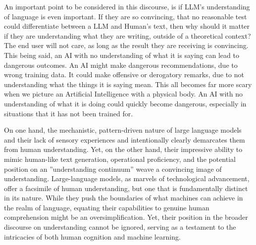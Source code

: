 \documentclass{article}
\begin{document}
An important point to be considered in this discourse, is if LLM's understanding of language is even important. If they are so convincing, that no reasonable test could differentiate between a LLM and Human's text, then why should it matter if they are understanding what they are writing, outside of a theoretical context? The end user will not care, as long as the result they are receiving is convincing. This being said, an AI with no understanding of what it is saying can lead to dangerous outcomes. An AI might make dangerous recommendations, due to wrong training data. It could make offensive or derogatory remarks, due to not understanding what the things it is saying mean. This all becomes far more scary when we picture an Artificial Intelligence with a physical body. An AI with no understanding of what it is doing could quickly become dangerous, especially in situations that it has not been trained for.

On one hand, the mechanistic, pattern-driven nature of large language models and their lack of sensory experiences and intentionally clearly
demarcates them from human understanding. Yet, on the other hand, their
impressive ability to mimic human-like text generation, operational proficiency,
and the potential position on an ”understanding continuum” weave a convincing image of understanding. Large-language models, as marvels of technological advancement, offer a facsimile of human understanding, but one that is fundamentally distinct in its nature. While they push the boundaries of what machines can achieve in the realm of language, equating
their capabilities to genuine human comprehension might be an oversimplification. Yet, their position in the broader discourse on understanding cannot be ignored, serving as a testament to the intricacies of both human cognition and
machine learning.


 
\end{document}
